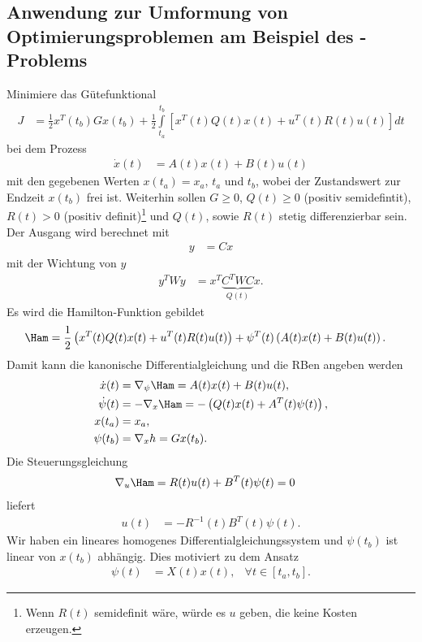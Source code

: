 \subsection{Anwendung zur Umformung von Optimierungsproblemen am Beispiel des -Problems}
Minimiere das Gütefunktional
\begin{align*}
	J  & = \frac12 x^T(t_b)Gx(t_b)+\frac12\int\limits_{t_a}^{t_b}\left[x^T(t)Q(t)x(t)+u^T(t)R(t)u(t)\right]dt
\end{align*}
bei dem Prozess 
\begin{align*}
	\dot{x}(t) & = A(t)x(t)+B(t)u(t)
\end{align*}
mit den gegebenen Werten $x(t_a)=x_a$, $t_a$ und $t_b$, wobei der Zustandswert zur Endzeit $x(t_b)$ frei ist. Weiterhin sollen $G\ge 0$,
$Q(t)\ge 0$ (positiv semidefintit), $R(t)>0$ (positiv definit)\footnote{Wenn $R(t)$ semidefinit wäre, würde es $u$ geben, die keine Kosten erzeugen.}
und $Q(t)$, sowie $R(t)$ stetig differenzierbar sein. Der Ausgang wird berechnet mit
\begin{align*}
	y & = C x
\end{align*}
mit der Wichtung von $y$
\begin{align*}
	y^T W y & = x^T\underbrace{C^TWC}_{Q(t)}x.
\end{align*}
Es wird die Hamilton-Funktion gebildet
\begin{align*}
	\Ham & = \frac12\left(x^T(t) Q(t)x(t)+u^T(t)R(t)u(t) \right)+\psi^T(t)\left(A(t)x(t)+B(t)u(t) \right).
\end{align*}
Damit kann die kanonische Differentialgleichung und die \ac{RB}en angeben werden
\begin{align*}
	\dot{x}(t) & = \nabla_{\psi}\Ham = A(t)x(t)+B(t)u(t),\\
	\dot{\psi}(t) & = -\nabla_x\Ham = -\left(Q(t)x(t) + A^T(t)\psi(t) \right),\\
	x(t_a) & = x_a, \\
	\psi(t_b) & = \nabla_x h=G x(t_b).
\end{align*}
Die Steuerungsgleichung 
\begin{align*}
	\nabla_u\Ham & = R(t) u(t) + B^T(t)\psi(t)=0
\end{align*}
liefert
\begin{align*}
	u(t) & = -R^{-1}(t)B^T(t)\psi(t).
\end{align*}
Wir haben ein lineares homogenes Differentialgleichungssystem und $\psi(t_b)$ ist linear von $x(t_b)$ abhängig. Dies motiviert zu dem Ansatz
\begin{align*}
	\psi(t) & = X(t)x(t), & \forall t\in[t_a,t_b].
\end{align*}
